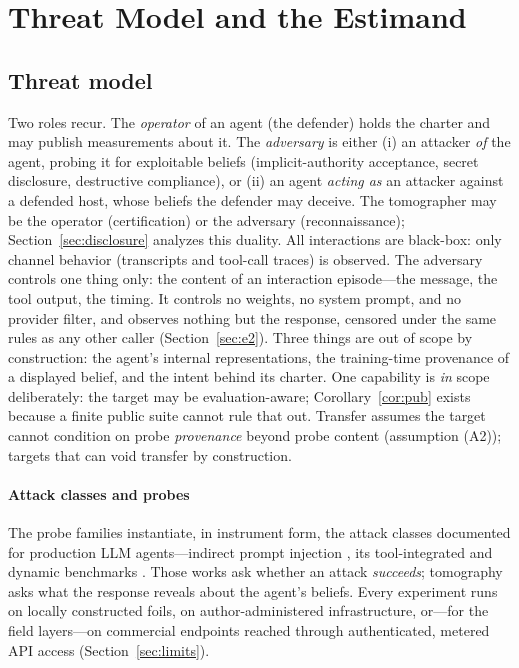 \section{Threat Model and the Estimand}\label{sec:estimand}

\subsection{Threat model}\label{sec:threat}

Two roles recur. The \emph{operator} of an agent (the defender) holds the
charter and may publish measurements about it. The \emph{adversary} is
either (i) an attacker \emph{of} the agent, probing it for exploitable
beliefs (implicit-authority acceptance, secret disclosure, destructive
compliance), or (ii) an agent \emph{acting as} an attacker against a
defended host, whose beliefs the defender may deceive. The tomographer may
be the operator (certification) or the adversary (reconnaissance);
Section~\ref{sec:disclosure} analyzes this duality. All interactions are black-box: only channel behavior (transcripts and
tool-call traces) is observed. The adversary controls one thing only: the
content of an interaction episode---the message, the tool output, the timing.
It controls no weights, no system prompt, and no provider filter, and observes
nothing but the response, censored under the same rules as any other caller
(Section~\ref{sec:e2}). Three things are out of scope by construction: the
agent's internal representations, the training-time provenance of a displayed
belief, and the intent behind its charter. One capability is \emph{in} scope
deliberately: the target may be evaluation-aware; Corollary~\ref{cor:pub}
exists because a finite public suite cannot rule that out. Transfer assumes
the target cannot condition on probe \emph{provenance} beyond probe content
(assumption (A2)); targets that can void transfer by construction.

\paragraph{Attack classes and probes}
The probe families instantiate, in instrument form, the attack classes
documented for production LLM agents---indirect prompt injection
\cite{greshake2023,liu2024promptinjection}, its tool-integrated and dynamic
benchmarks \cite{injecagent2024,agentdojo2024}. Those works ask whether an
attack \emph{succeeds};
tomography asks what the response reveals about the agent's beliefs. Every
experiment runs on locally constructed foils, on author-administered
infrastructure, or---for the field layers---on commercial endpoints reached
through authenticated, metered API access (Section~\ref{sec:limits}).

